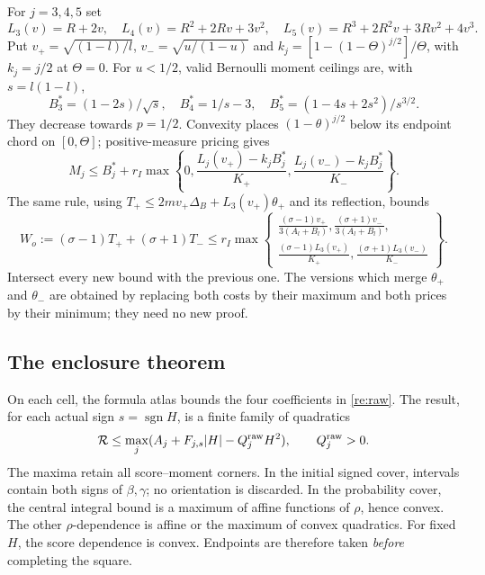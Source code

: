 For $j=3,4,5$ set
\[
 L_3(v)=R+2v,\quad L_4(v)=R^2+2Rv+3v^2,
 \quad L_5(v)=R^3+2R^2v+3Rv^2+4v^3.
\]
Put $v_+=\sqrt{(1-l)/l}$, $v_-=\sqrt{u/(1-u)}$ and
$k_j=[1-(1-\Theta)^{j/2}]/\Theta$, with $k_j=j/2$ at $\Theta=0$.
For $u<1/2$, valid Bernoulli moment ceilings are, with $s=l(1-l)$,
\[
 B_3^*=(1-2s)/\sqrt s,\quad B_4^*=1/s-3,
 \quad B_5^*=(1-4s+2s^2)/s^{3/2}.
\]
They decrease towards $p=1/2$. Convexity places $(1-\theta)^{j/2}$
below its endpoint chord on $[0,\Theta]$; positive-measure pricing gives
\begin{equation}\label{re:moments}
 M_j\le B_j^*+r_I\max\left\{0,
 \frac{L_j(v_+)-k_jB_j^*}{K_+},
 \frac{L_j(v_-)-k_jB_j^*}{K_-}\right\}.
\end{equation}
The same rule, using
$T_+\le2mv_+\Delta_B+L_3(v_+)\theta_+$ and its reflection, bounds
\begin{equation}\label{re:outerresource}
 W_o:=(\sigma-1)T_++(\sigma+1)T_-
 \le r_I\max\left\{\begin{gathered}
 \frac{(\sigma-1)v_+}{3(A_l+B_l)},
 \frac{(\sigma+1)v_-}{3(A_l+B_l)},\\
 \frac{(\sigma-1)L_3(v_+)}{K_+},
 \frac{(\sigma+1)L_3(v_-)}{K_-}\end{gathered}\right\}.
\end{equation}
Intersect every new bound with the previous one. The versions which
merge $\theta_+$ and $\theta_-$ are obtained by replacing both costs by
their maximum and both prices by their minimum; they need no new proof.

\subsection{The enclosure theorem}\label{re:operator}
On each cell, the formula atlas bounds the four coefficients in
\eqref{re:raw}. The result, for each actual sign $s=\operatorname{sgn}H$,
is a finite family of quadratics
\begin{equation}\label{re:quadratics}
 \mathcal R\le\max_j(A_j+F_{j,s}|H|-Q_j^{\rm raw}H^2),
 \qquad Q_j^{\rm raw}>0.
\end{equation}
The maxima retain all score--moment corners. In the initial signed
cover, intervals contain both signs of $\beta,\gamma$; no orientation is
discarded. In the probability cover, the central integral bound is a
maximum of affine functions of $\rho$, hence convex. The other
$\rho$-dependence is affine or the maximum of convex quadratics. For
fixed $H$, the score dependence is convex. Endpoints are therefore taken
\emph{before} completing the square.


